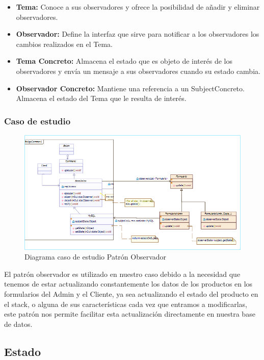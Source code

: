 \begin{itemize}
	\item \textbf{Tema: }Conoce a sus observadores y ofrece la posibilidad de añadir y eliminar observadores.
	\item \textbf{Observador: }Define la interfaz que sirve para notificar a los observadores los cambios realizados en el Tema.
	\item \textbf{Tema Concreto: }Almacena el estado que es objeto de interés de los observadores y envía un mensaje a sus observadores cuando su estado cambia.
	\item \textbf{Observador Concreto: }Mantiene una referencia a un SubjectConcreto. Almacena el estado del Tema que le resulta de interés.
\end{itemize}



\subsubsection{Caso de estudio}
	\begin{figure}[h!]
	\centering
	\includegraphics[width=1.0\linewidth]{arquitectura/imagenes/DiagramaObservador}
	\caption{Diagrama caso de estudio Patrón Observador}
\end{figure}

El patrón observador es utilizado en nuestro caso debido a la necesidad que tenemos de estar actualizando constantemente los datos de los productos en los formularios del Admin y el Cliente, ya sea actualizando el estado del producto en el stack, o alguna de sus características cada vez que entramos a modificarlas, este patrón nos permite facilitar esta actualización directamente en nuestra base de datos.


\subsection{Estado}
